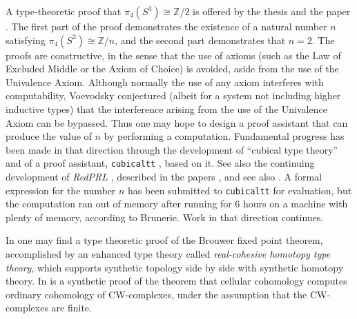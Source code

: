 \documentclass[letter,12pt]{amsart}
\theoremstyle{definition}
\theoremstyle{remark}
\numberwithin{equation}{section}
\newcommand{\ZZ}{\mathbb{Z}}
\begin{document}
A type-theoretic proof that $\pi_4 (S^3) \cong \ZZ/2$ is offered by the thesis \citep{1606.05916} and the paper \citep{1710.10307}.
The first part of the proof demonstrates the
existence of a natural number $n$ satisfying $\pi_4 (S^3) \cong \ZZ/n$, and the second part demonstrates that $n=2$.  The proofs are
constructive, in the sense that the use of axioms (such as the Law of Excluded Middle or the Axiom of Choice) is avoided, aside from the use of
the Univalence Axiom.  Although normally the use of any axiom interferes with computability, Voevodsky conjectured (albeit for a system not
including higher inductive types) that the interference arising from the use of the Univalence Axiom can be bypassed.  Thus one may hope to
design a proof assistant that can produce the value of $n$ by performing a computation.  Fundamental progress has been made in that direction
through the development of ``cubical type theory'' \citep{MR3281415,1611.02108,1802.01170} and of a proof assistant, {\tt cubicaltt} \citep{cubicaltt}, based
on it.  See also the continuing development of {\em RedPRL} \citep{RedPRL}, described in the papers
\citep{harper-et-al-1,harper-et-al-2,harper-et-al-3,harper-et-al-4}, and see also \citep{cart-cube}.
A formal expression for the number $n$ has been submitted to {\tt cubicaltt} for
evaluation, but the computation ran out of memory after running for 6 hours on a machine with plenty of memory, according to Brunerie.  Work in
that direction continues.

In \citep{1509.07584} one may find a type theoretic proof of the Brouwer fixed point theorem, accomplished by an enhanced type theory called
{\em real-cohesive homotopy type theory}, which supports synthetic topology side by side with synthetic homotopy theory.
In \citep{1802.02191} is a synthetic proof of the theorem that cellular cohomology computes ordinary cohomology of CW-complexes, under the
assumption that the CW-complexes are finite.



\end{document}
